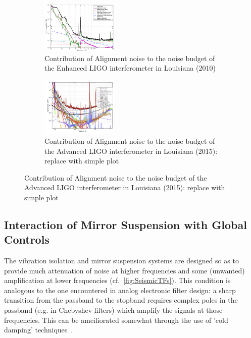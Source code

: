 \begin{figure}[h]
  \begin{subfigure}{0.4\columnwidth}
    \includegraphics[width=0.4\textwidth]{Figures/S6_NB.pdf}
    \caption{Contribution of Alignment noise to the noise budget of the Enhanced LIGO interferometer in Louisiana (2010)}
    \label{fig:eLIGO}
  \end{subfigure}
  \begin{subfigure}{0.4\columnwidth}
    \includegraphics[width=0.4\textwidth]{Figures/darm_nb.png}
    \caption{Contribution of Alignment noise to the noise budget of the Advanced LIGO interferometer in Louisiana (2015): replace with simple plot}
    \label{fig:aLIGO}
  \end{subfigure}
\end{figure}


\subsection{Interaction of Mirror Suspension with Global Controls}
The vibration isolation and mirror suspension systems are designed so as to
provide much attenuation of noise at higher frequencies and some (unwanted) amplification
at lower frequencies (cf.~\ref{fig:SeismicTFs}). This condition is analogous to the
one encountered in analog electronic filter design:  a sharp transition from
the passband to the stopband requires complex poles in the passband (e.g.
in Chebyshev filters) which amplify the signals at those frequencies. This
can be ameiliorated somewhat through the use of 'cold damping'
techniques~\cite{Kuroda:1982vf, Forward:1979ks}.



